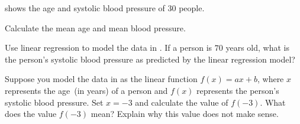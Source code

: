 \documentclass[a4paper,oneside,12pt]{article}
\begin{document}
\begin{example}
 shows the age and systolic blood pressure
of $30$ people.
\begin{packedenum}
\item\label{subex:blood_pressure_mean_age_pressure}
  Calculate the mean age and mean blood pressure.

\item\label{subex:blood_pressure_linear_regression}
  Use linear regression to model the data in
  .  If a person is $70$ years old, what is
  the person's systolic blood pressure as predicted by the linear
  regression model?

\item\label{subex:blood_pressure_nonsense}
  Suppose you model the data in  as the
  linear function $f(x) = ax + b$, where $x$ represents the age~(in
  years) of a person and $f(x)$ represents the person's systolic blood
  pressure.  Set $x = -3$ and calculate the value of $f(-3)$.  What
  does the value $f(-3)$ mean?  Explain why this value does not make
  sense.
\end{packedenum}
\end{example}
\end{document}
